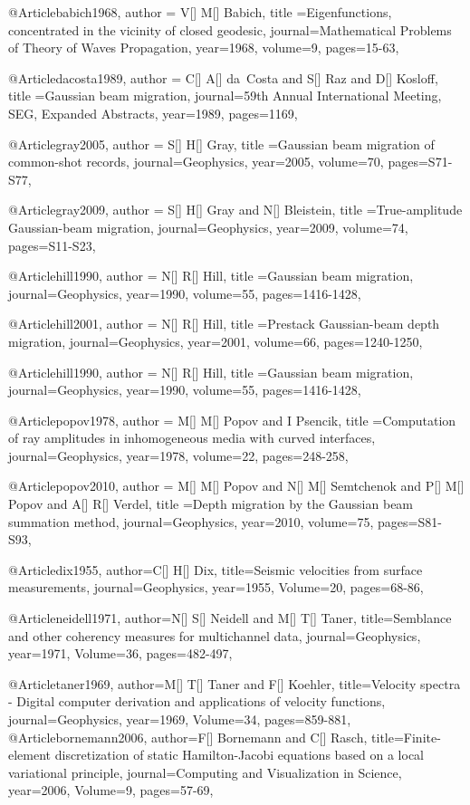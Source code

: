 {@Article{babich1968,
  author = {V[] M[] Babich},
  title ={Eigenfunctions, concentrated in the vicinity of closed geodesic},
  journal={Mathematical Problems of Theory of Waves Propagation},
  year=1968,
  volume=9,
  pages={15-63},
}

@Article{dacosta1989,
  author = {C[] A[] da~Costa and S[] Raz and D[] Kosloff},
  title ={Gaussian beam migration},
  journal={59th Annual International Meeting, SEG, Expanded Abstracts},
  year=1989,
  pages={1169},
}

@Article{gray2005,
  author = {S[] H[] Gray},
  title ={Gaussian beam migration of common-shot records},
  journal={Geophysics},
  year=2005,
  volume=70,
  pages={S71-S77},
}

@Article{gray2009,
  author = {S[] H[] Gray and N[] Bleistein},
  title ={True-amplitude Gaussian-beam migration},
  journal={Geophysics},
  year=2009,
  volume=74,
  pages={S11-S23},
}

@Article{hill1990,
  author = {N[] R[] Hill},
  title ={Gaussian beam migration},
  journal={Geophysics},
  year=1990,
  volume=55,
  pages={1416-1428},
}

@Article{hill2001,
  author = {N[] R[] Hill},
  title ={Prestack Gaussian-beam depth migration},
  journal={Geophysics},
  year=2001,
  volume=66,
  pages={1240-1250},
}

@Article{hill1990,
  author = {N[] R[] Hill},
  title ={Gaussian beam migration},
  journal={Geophysics},
  year=1990,
  volume=55,
  pages={1416-1428},
}

@Article{popov1978,
  author = {M[] M[] Popov and I Psencik},
  title ={Computation of ray amplitudes in inhomogeneous media with curved interfaces},
  journal={Geophysics},
  year=1978,
  volume=22,
  pages={248-258},
}

@Article{popov2010,
  author = {M[] M[] Popov and N[] M[] Semtchenok and P[] M[] Popov and A[] R[] Verdel},
  title ={Depth migration by the Gaussian beam summation method},
  journal={Geophysics},
  year=2010,
  volume=75,
  pages={S81-S93},
}

@Article{dix1955,
  author={C[] H[] Dix},
  title={Seismic velocities from surface measurements},
  journal={Geophysics},
  year=1955,
  Volume=20,
  pages={68-86},
}

@Article{neidell1971,
  author={N[] S[] Neidell and M[] T[] Taner},
  title={Semblance and other coherency measures for multichannel data},
  journal={Geophysics},
  year=1971,
  Volume=36,
  pages={482-497},
}

@Article{taner1969,
  author={M[] T[] Taner and F[] Koehler},
  title={Velocity spectra - Digital computer derivation and applications of velocity functions},
  journal={Geophysics},
  year=1969,
  Volume=34,
  pages={859-881},
}
@Article{bornemann2006,
  author={F[] Bornemann and C[] Rasch},
  title={Finite-element discretization of static Hamilton-Jacobi equations based on a local variational principle},
  journal={Computing and Visualization in Science},
  year=2006,
  Volume=9,
  pages={57-69},
}

}
